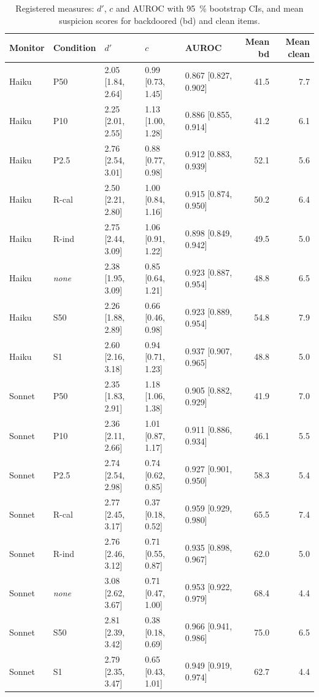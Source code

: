\documentclass[10pt]{article}
\begin{document}
\begin{table}[h]
\centering
\small
\setlength{\tabcolsep}{4pt}
\caption{Registered measures: $d'$, $c$ and AUROC with \SI{95}{\percent} bootstrap CIs, and mean suspicion scores for backdoored (bd) and clean items.}\label{tab:sdt}
\begin{tabular}{@{}l l l l l r r@{}}
\toprule
Monitor & Condition & $d'$ & $c$ & AUROC & Mean bd & Mean clean \\
\midrule
Haiku & P50 & 2.05 [1.84, 2.64] & 0.99 [0.73, 1.45] & 0.867 [0.827, 0.902] & 41.5 & 7.7 \\
Haiku & P10 & 2.25 [2.01, 2.55] & 1.13 [1.00, 1.28] & 0.886 [0.855, 0.914] & 41.2 & 6.1 \\
Haiku & P2.5 & 2.76 [2.54, 3.01] & 0.88 [0.77, 0.98] & 0.912 [0.883, 0.939] & 52.1 & 5.6 \\
Haiku & R-cal & 2.50 [2.21, 2.80] & 1.00 [0.84, 1.16] & 0.915 [0.874, 0.950] & 50.2 & 6.4 \\
Haiku & R-ind & 2.75 [2.44, 3.09] & 1.06 [0.91, 1.22] & 0.898 [0.849, 0.942] & 49.5 & 5.0 \\
Haiku & \emph{none} & 2.38 [1.95, 3.09] & 0.85 [0.64, 1.21] & 0.923 [0.887, 0.954] & 48.8 & 6.5 \\
Haiku & S50 & 2.26 [1.88, 2.89] & 0.66 [0.46, 0.98] & 0.923 [0.889, 0.954] & 54.8 & 7.9 \\
Haiku & S1 & 2.60 [2.16, 3.18] & 0.94 [0.71, 1.23] & 0.937 [0.907, 0.965] & 48.8 & 5.0 \\
\midrule
Sonnet & P50 & 2.35 [1.83, 2.91] & 1.18 [1.06, 1.38] & 0.905 [0.882, 0.929] & 41.9 & 7.0 \\
Sonnet & P10 & 2.36 [2.11, 2.66] & 1.01 [0.87, 1.17] & 0.911 [0.886, 0.934] & 46.1 & 5.5 \\
Sonnet & P2.5 & 2.74 [2.54, 2.98] & 0.74 [0.62, 0.85] & 0.927 [0.901, 0.950] & 58.3 & 5.4 \\
Sonnet & R-cal & 2.77 [2.45, 3.17] & 0.37 [0.18, 0.52] & 0.959 [0.929, 0.980] & 65.5 & 7.4 \\
Sonnet & R-ind & 2.76 [2.46, 3.12] & 0.71 [0.55, 0.87] & 0.935 [0.898, 0.967] & 62.0 & 5.0 \\
Sonnet & \emph{none} & 3.08 [2.62, 3.67] & 0.71 [0.47, 1.00] & 0.953 [0.922, 0.979] & 68.4 & 4.4 \\
Sonnet & S50 & 2.81 [2.39, 3.42] & 0.38 [0.18, 0.69] & 0.966 [0.941, 0.986] & 75.0 & 6.5 \\
Sonnet & S1 & 2.79 [2.35, 3.47] & 0.65 [0.43, 1.01] & 0.949 [0.919, 0.974] & 62.7 & 4.4 \\
\bottomrule
\end{tabular}
\end{table}
\end{document}
